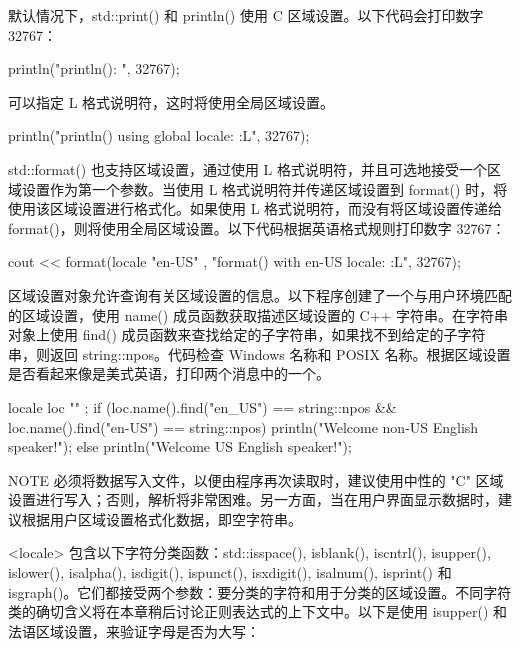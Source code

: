 默认情况下，std::print() 和 println() 使用 C 区域设置。以下代码会打印数字 32767：

\begin{cpp}
println("println(): {}", 32767);
\end{cpp}

可以指定 L 格式说明符，这时将使用全局区域设置。

\begin{cpp}
println("println() using global locale: {:L}", 32767);
\end{cpp}

std::format() 也支持区域设置，通过使用 L 格式说明符，并且可选地接受一个区域设置作为第一个参数。当使用 L 格式说明符并传递区域设置到 format() 时，将使用该区域设置进行格式化。如果使用 L 格式说明符，而没有将区域设置传递给 format()，则将使用全局区域设置。以下代码根据英语格式规则打印数字 32767：

\begin{cpp}
cout << format(locale { "en-US" }, "format() with en-US locale: {:L}", 32767);
\end{cpp}

区域设置对象允许查询有关区域设置的信息。以下程序创建了一个与用户环境匹配的区域设置，使用 name() 成员函数获取描述区域设置的 C++ 字符串。在字符串对象上使用 find() 成员函数来查找给定的子字符串，如果找不到给定的子字符串，则返回 string::npos。代码检查 Windows 名称和 POSIX 名称。根据区域设置是否看起来像是美式英语，打印两个消息中的一个。

\begin{cpp}
locale loc { "" };
if (loc.name().find("en_US") == string::npos &&
    loc.name().find("en-US") == string::npos) {
    println("Welcome non-US English speaker!");
} else {
    println("Welcome US English speaker!");
}
\end{cpp}

\begin{myNotic}{NOTE}
必须将数据写入文件，以便由程序再次读取时，建议使用中性的 "C" 区域设置进行写入；否则，解析将非常困难。另一方面，当在用户界面显示数据时，建议根据用户区域设置格式化数据，即空字符串。
\end{myNotic}


<locale> 包含以下字符分类函数：std::isspace(), isblank(), iscntrl(), isupper(), islower(), isalpha(), isdigit(), ispunct(), isxdigit(), isalnum(), isprint() 和 isgraph()。它们都接受两个参数：要分类的字符和用于分类的区域设置。不同字符类的确切含义将在本章稍后讨论正则表达式的上下文中。以下是使用 isupper() 和法语区域设置，来验证字母是否为大写：

